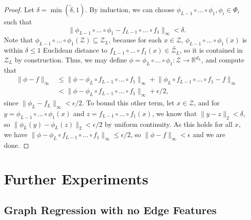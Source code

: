 \documentclass{article} \usepackage{iclr2023_conference,times}
\newcommand{\RR}{\mathbb R}
\newcommand{\mc}[1]{\mathcal{#1}}
\newcommand\norm[1]{\lVert#1\rVert}
\begin{document}
\begin{proof}
Let $\delta = \min(\tilde \delta, 1)$. By induction, we can choose $\phi_{L-1} \circ \ldots \circ \phi_1, \phi_i \in \Phi_i$ such that 
\begin{equation}
\norm{\phi_{L-1} \circ \ldots \circ \phi_1 - f_{L-1} \circ \ldots \circ f_1}_\infty < \delta.
\end{equation}
Note that $\phi_{L-1} \circ \ldots \circ \phi_1(\mc Z) \subseteq \mc Z_L$, because for each $x \in \mc Z$, $\phi_{L-1} \circ \ldots \circ \phi_1(x)$ is within $\delta \leq 1$ Euclidean distance to $f_{L-1} \circ \ldots \circ f_1(x) \in \tilde{\mc Z_L}$, so it is contained in $\mc Z_L$ by construction. Thus, we may define $\phi = \phi_L \circ \ldots \circ \phi_1: \mc Z \to \RR^{d_L}$, and compute that
\begin{align}
    \norm{\phi - f}_\infty & \leq \norm{\phi - \phi_L \circ f_{L-1} \circ \ldots \circ f_1}_\infty + \norm{\phi_L \circ f_{L-1}\circ \ldots \circ f_1 - f}_\infty \\
& < \norm{\phi - \phi_L \circ f_{L-1} \circ \ldots \circ f_1}_\infty + \epsilon / 2,
\end{align}
since $\norm{\phi_L - f_L}_\infty < \epsilon / 2$. To bound this other term, let $x \in \mc Z$, and for $y = \phi_{L-1} \circ \ldots \circ \phi_1(x)$ and $z = f_{L-1} \circ \ldots \circ f_1(x)$, we know that $\norm{y-z}_2 < \delta$, so $\norm{\phi_L(y) - \phi_L(z)}_2 < \epsilon/2$ by uniform continuity. As this holds for all $x$, we have $\norm{\phi - \phi_L \circ f_{L-1} \circ \ldots \circ f_1}_\infty \leq \epsilon / 2$, so $\norm{\phi - f}_\infty < \epsilon$ and we are done.
\end{proof}


\section{Further Experiments}

\subsection{Graph Regression with no Edge Features}\label{appendix:no_edge_features}
\end{document}
